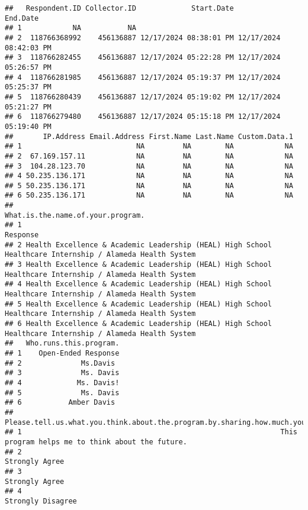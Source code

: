 \documentclass[
]{article}
\begin{document}
\begin{verbatim}
##   Respondent.ID Collector.ID             Start.Date               End.Date
## 1            NA           NA                                              
## 2  118766368992    456136887 12/17/2024 08:38:01 PM 12/17/2024 08:42:03 PM
## 3  118766282455    456136887 12/17/2024 05:22:28 PM 12/17/2024 05:26:57 PM
## 4  118766281985    456136887 12/17/2024 05:19:37 PM 12/17/2024 05:25:37 PM
## 5  118766280439    456136887 12/17/2024 05:19:02 PM 12/17/2024 05:21:27 PM
## 6  118766279480    456136887 12/17/2024 05:15:18 PM 12/17/2024 05:19:40 PM
##       IP.Address Email.Address First.Name Last.Name Custom.Data.1
## 1                           NA         NA        NA            NA
## 2  67.169.157.11            NA         NA        NA            NA
## 3  104.28.123.70            NA         NA        NA            NA
## 4 50.235.136.171            NA         NA        NA            NA
## 5 50.235.136.171            NA         NA        NA            NA
## 6 50.235.136.171            NA         NA        NA            NA
##                                                                          What.is.the.name.of.your.program.
## 1                                                                                                 Response
## 2 Health Excellence & Academic Leadership (HEAL) High School Healthcare Internship / Alameda Health System
## 3 Health Excellence & Academic Leadership (HEAL) High School Healthcare Internship / Alameda Health System
## 4 Health Excellence & Academic Leadership (HEAL) High School Healthcare Internship / Alameda Health System
## 5 Health Excellence & Academic Leadership (HEAL) High School Healthcare Internship / Alameda Health System
## 6 Health Excellence & Academic Leadership (HEAL) High School Healthcare Internship / Alameda Health System
##   Who.runs.this.program.
## 1    Open-Ended Response
## 2              Ms.Davis 
## 3              Ms. Davis
## 4             Ms. Davis!
## 5              Ms. Davis
## 6           Amber Davis 
##   Please.tell.us.what.you.think.about.the.program.by.sharing.how.much.you.agree.with.each.of.these.statements.
## 1                                                             This program helps me to think about the future.
## 2                                                                                               Strongly Agree
## 3                                                                                               Strongly Agree
## 4                                                                                            Strongly Disagree

\end{verbatim}
\end{document}
